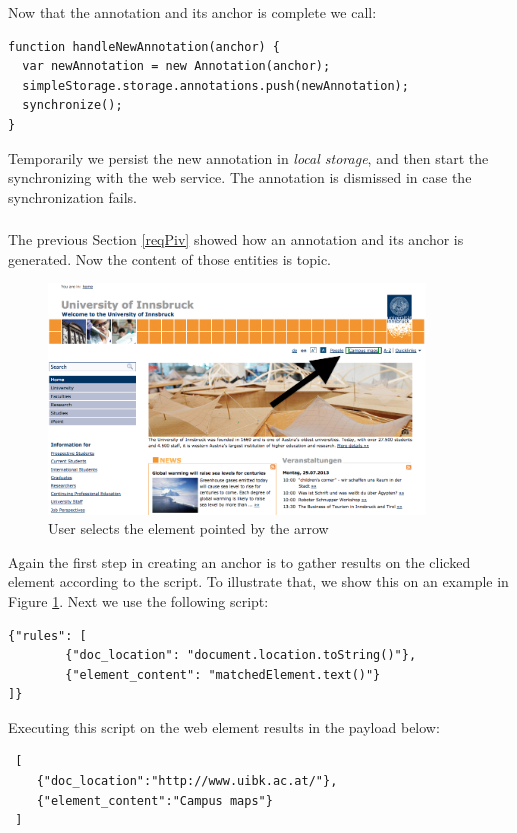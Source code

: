 Now that the annotation and its anchor is complete we call:
\begin{lstlisting}
function handleNewAnnotation(anchor) {
  var newAnnotation = new Annotation(anchor);  
  simpleStorage.storage.annotations.push(newAnnotation);
  synchronize();
}
\end{lstlisting}

Temporarily we persist the new annotation in \textit{local storage}, and then start the synchronizing with the web service. The annotation is dismissed in case the synchronization fails. 


\subsubsection[Uniform Sending Format]{\reqPv}\label{reqPv}
The previous Section \ref{reqPiv} showed how an annotation and its anchor is generated. Now the content of those entities is topic. 

\begin{figure}\centering
	\includegraphics[width=10cm]{images/anchor-example-uibk.png}
\caption{User selects the element pointed by the arrow}
\label{anchor-example-uibk}
\end{figure}


Again the first step in creating an anchor is to gather results on the clicked element according to the script. To illustrate that, we show this on an example in Figure \ref{anchor-example-uibk}. 
Next we use the following script:
\begin{lstlisting}
{"rules": [
        {"doc_location": "document.location.toString()"},
        {"element_content": "matchedElement.text()"}
]}
\end{lstlisting}

Executing this script on the web element results in the payload below:
\begin{lstlisting}
 [
 	{"doc_location":"http://www.uibk.ac.at/"},
 	{"element_content":"Campus maps"}
 ]
\end{lstlisting}

